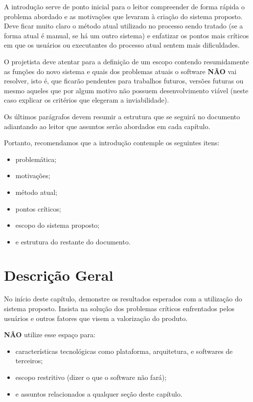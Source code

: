 \documentclass[12pt,openright,a4paper,brazil]{abntex2}
\begin{document}
A introdução serve de ponto inicial para o leitor compreender de forma rápida o problema abordado e as motivações que levaram à criação do sistema proposto. Deve ficar muito claro o método atual utilizado no processo sendo tratado (se a forma atual é manual, se há um outro sistema) e enfatizar os pontos mais críticos em que os usuários ou executantes do processo atual sentem mais dificuldades. 

O projetista deve atentar para a definição de um escopo contendo resumidamente as funções do novo sistema e quais dos problemas atuais o software \textbf{NÃO} vai resolver, isto é, que ficarão pendentes para trabalhos futuros, versões futuras ou mesmo aqueles que por algum motivo não possuem desenvolvimento viável (neste caso explicar os critérios que elegeram a inviabilidade). 

Os últimos parágrafos devem resumir a estrutura que se seguirá no documento adiantando ao leitor que assuntos serão abordados em cada capítulo.

Portanto, recomendamos que a introdução contemple os seguintes itens:
\begin{itemize}
	\item problemática;
	\item motivações;
	\item método atual;
	\item pontos críticos;
	\item escopo do sistema proposto;
	\item e estrutura do restante do documento.
\end{itemize}

\chapter{Descrição Geral}

No início deste capítulo, demonstre os resultados esperados com a utilização do sistema proposto. Insista na solução dos problemas críticos enfrentados pelos usuários e outros fatores que visem a valorização do produto.

\textbf{NÃO} utilize esse espaço para:
\begin{itemize}
	\item características tecnológicas como plataforma, arquitetura, e softwares de terceiros;
	\item escopo restritivo (dizer o que o software não fará);
	\item e assuntos relacionados a qualquer seção deste capítulo.
\end{itemize} 
\end{document}
